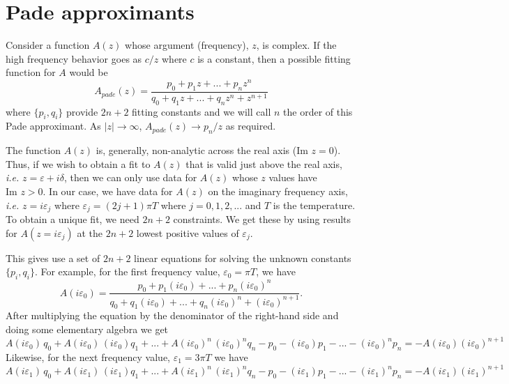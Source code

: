 \chapter{Pade approximants}

Consider a function $A(z)$ whose argument (frequency), 
$z$, is complex. 
If the high frequency behavior goes as $c/ z$
where $c$ is a constant,
then a possible fitting function for $A$ would be
\begin{equation}
\label{pade}
A_{pade}(z) = \frac{p_0 + p_1 z +  ...  + p_n z^n}
{  q_0 + q_1 z + ... + q_n z^n + z^{n+1}}
\end{equation}
where $\{p_i, q_i\}$ provide $2n + 2$ fitting constants
and we will call $n$ the order of this Pade approximant.
As $|z| \to \infty$, $A_{pade}(z) \to p_n / z$ as required.

The function $A(z)$ is, generally, non-analytic across
the real axis ($\textrm{Im } z = 0$).  Thus, if we wish to
obtain a fit to $A(z)$ that is valid just above the real axis,
\textit{i.e.} $z = \varepsilon + i\delta$, then we can
only use data for $A(z)$ whose $z$ values have $\textrm{Im }z > 0$.
In our case, we have data for $A(z)$ on the imaginary frequency axis,
\textit{i.e.} $z = i \varepsilon_j$ where $\varepsilon_j = 
(2 j + 1)\pi T$ where $j = 0, 1, 2, ...$ and $T$ is the temperature.
To obtain a unique fit, we need $2n + 2$ constraints.  We get
these by using results for
$A(z = i\varepsilon_j)$ at the $2n + 2$
lowest positive values of $\varepsilon_j$.

This gives use a set of $2n +2$ linear equations for solving
the unknown constants $\{p_i, q_i\}$.  For example, for the
first frequency value, $\varepsilon_0 = \pi T$, we have
\begin{equation}
A(i\varepsilon_0)  =  
\frac{p_0 + p_1 (i\varepsilon_0) + ... + p_n (i\varepsilon_0)^n}
{q_0 + q_1 (i\varepsilon_0) + ... + q_n (i\varepsilon_0)^n +
(i\varepsilon_0)^{n+1} }. 
\end{equation}
After multiplying the equation by the denominator of the
right-hand side and doing some elementary algebra we get
\begin{equation}
A(i\varepsilon_0)\,q_0 +
A(i\varepsilon_0)\,(i\varepsilon_0) q_1 + ... +
A(i\varepsilon_0)^n\,(i\varepsilon_0)^n q_n -
p_0 - 
(i\varepsilon_0) p_1 - ... -(i\varepsilon_0)^n p_n 
= -A(i\varepsilon_0) (i\varepsilon_0)^{n+1}
\end{equation}
Likewise, for the next frequency value, $\varepsilon_1 = 3 \pi T$
we have
\begin{equation}
A(i\varepsilon_1)\,q_0 +
A(i\varepsilon_1)\,(i\varepsilon_1) q_1 + ... +
A(i\varepsilon_1)^n\,(i\varepsilon_1)^n q_n -
p_0 - 
(i\varepsilon_1) p_1 - ... -(i\varepsilon_1)^n p_n 
= -A(i\varepsilon_1) (i\varepsilon_1)^{n+1}
\end{equation}

